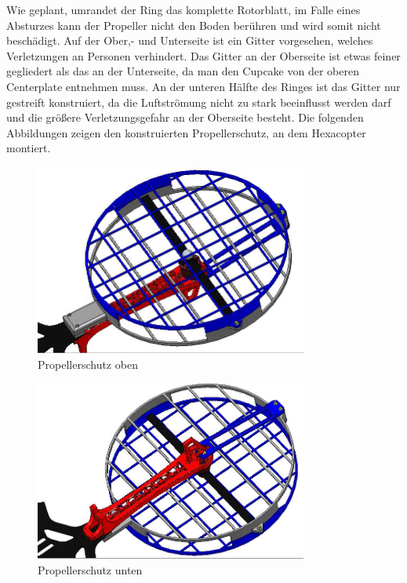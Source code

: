 	Wie geplant, umrandet der Ring das komplette Rotorblatt, im Falle eines Absturzes kann der Propeller nicht den Boden berühren und wird somit nicht beschädigt.
	Auf der Ober,- und Unterseite ist ein Gitter vorgesehen, welches Verletzungen an Personen verhindert.
	Das Gitter an der Oberseite ist etwas feiner gegliedert als das an der Unterseite, da man den Cupcake von der oberen Centerplate entnehmen muss.
	An der unteren Hälfte des Ringes ist das Gitter nur gestreift konstruiert, da die Luftströmung nicht zu stark beeinflusst werden darf und die größere Verletzungsgefahr an der Oberseite besteht.
	Die folgenden Abbildungen zeigen den konstruierten Propellerschutz, an dem Hexacopter montiert.

			\begin{figure}[tbh]
			\begin{centering}
			\includegraphics[width = 0.8\textwidth]{Bilder/propellerschutz_gesamt_oben}
			\par\end{centering}
			\caption{Propellerschutz oben}
			\label{propellerschutz_gesamt_oben}
			\end{figure}

			\begin{figure}[H]
			\begin{centering}
			\includegraphics[width = 0.8\textwidth]{Bilder/propellerschutz_gesamt_unten}
			\par\end{centering}
			\caption{Propellerschutz unten}
			\label{propellerschutz_gesamt_unten}
			\end{figure}

